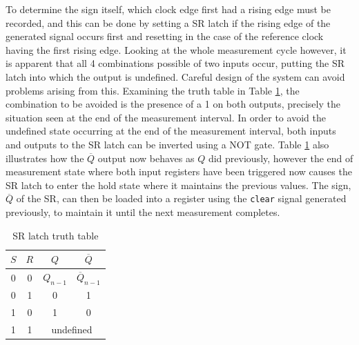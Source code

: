 To determine the sign itself, which clock edge first had a rising edge must be recorded, and this can be done by setting a \ac{SR} latch if the rising edge of the generated signal occurs first and resetting in the case of the reference clock having the first rising edge. Looking at the whole measurement cycle however, it is apparent that all 4 combinations possible of two inputs occur, putting the \ac{SR} latch into which the output is undefined. Careful design of the system can avoid problems arising from this. Examining the truth table in Table \ref{table:sr_tt}, the combination to be avoided is the presence of a 1 on both outputs, precisely the situation seen at the end of the measurement interval. In order to avoid the undefined state occurring at the end of the measurement interval, both inputs and outputs to the \ac{SR} latch can be inverted using a NOT gate. Table \ref{table:sr_tt} also illustrates how the $\overline{Q}$ output now behaves as $Q$ did previously, however the end of measurement state where both input registers have been triggered now causes the \ac{SR} latch to enter the hold state where it maintains the previous values. The sign, $\overline{Q}$ of the \ac{SR}, can then be loaded into a register using the \texttt{clear} signal generated previously, to maintain it until the next measurement completes.
\begin{table}[ht]
	\begin{center}
		\begin{tabular}{cc|cc}           
			$S$&$R$&$Q$&$\overline{Q}$\\
			\hline
			0&0&$Q_{n-1}$&$\overline{Q}_{n-1}$\T\\
			0&1&0&1\T\\
			1&0&1&0\T\\
			1&1&\multicolumn{2}{c}{undefined}\T\\					
		\end{tabular}
		\caption{SR latch truth table}
		\label{table:sr_tt}
	\end{center}
\end{table}

